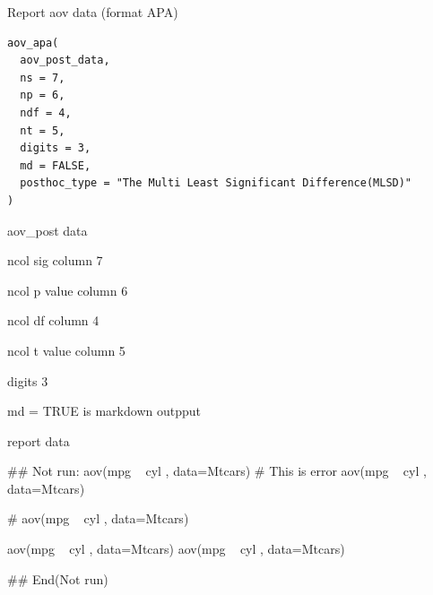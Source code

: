 \documentclass[a4paper]{book}
\begin{document}
%
\begin{Description}
Report aov data (format APA)
\end{Description}
%
\begin{Usage}
\begin{verbatim}
aov_apa(
  aov_post_data,
  ns = 7,
  np = 6,
  ndf = 4,
  nt = 5,
  digits = 3,
  md = FALSE,
  posthoc_type = "The Multi Least Significant Difference(MLSD)"
)
\end{verbatim}
\end{Usage}
%
\begin{Arguments}
\begin{ldescription}
\item[\code{aov\_post\_data}] aov\_post data

\item[\code{ns}] ncol sig column 7

\item[\code{np}] ncol p value column 6

\item[\code{ndf}] ncol df column 4

\item[\code{nt}] ncol t value column 5

\item[\code{digits}] digits 3

\item[\code{md}] md = TRUE is markdown outpput
\end{ldescription}
\end{Arguments}
%
\begin{Value}
report data
\end{Value}
%
\begin{Examples}
\begin{ExampleCode}
\#\# Not run: 
aov(mpg ~ cyl , data=Mtcars)%
# This is error
aov(mpg ~ cyl , data=Mtcars)%

# aov(mpg ~ cyl , data=Mtcars)%

aov(mpg ~ cyl , data=Mtcars)%
aov(mpg ~ cyl , data=Mtcars)%


## End(Not run)

\end{ExampleCode}
\end{Examples}
\end{document}
